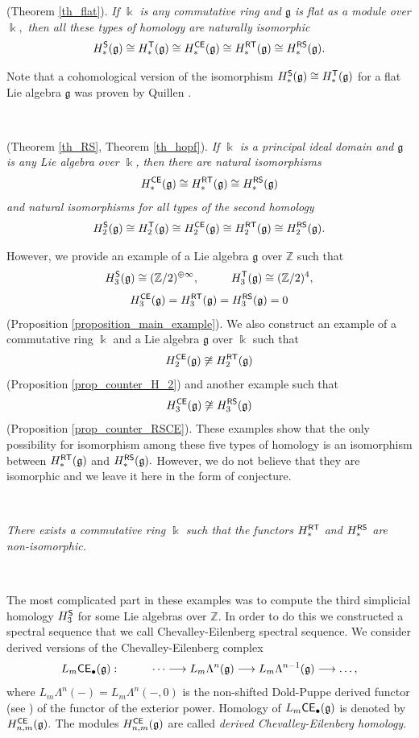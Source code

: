 \documentclass{amsart}
\numberwithin{equation}{section}
\theoremstyle{definition}
\def\gg{\mathfrak{g}}
\def\kk{\Bbbk}
\def\ZZ{\mathbb{Z}}
\begin{document}
 (Theorem \ref{th_flat}). {\it If $\kk$ is any commutative ring and $\gg$ is flat as a module over $\kk,$ then all these types of homology are naturally isomorphic
$$H^{\sf S}_*(\gg) \cong H^{\sf T}_*(\gg)\cong H^{\sf CE}_*(\gg)\cong  H^{\sf RT}_*(\gg)\cong H^{\sf RS}_*(\gg).$$}

Note that a cohomological version of the isomorphism $H^{\sf S}_*(\gg)\cong H^{\sf T}_*(\gg)$ for a flat Lie algebra $\gg$ was proven  by Quillen \cite[Prop. 3.7]{quillen1970co}. 

\ 
  
 (Theorem \ref{th_RS}, Theorem \ref{th_hopf}). {\it  If $\kk$ is a principal ideal domain and $\gg$ is any Lie algebra over $\kk$, then there are natural isomorphisms $$H^{\sf CE}_*(\gg)\cong H^{\sf RT}_*(\gg)\cong H^{\sf RS}_*(\gg)$$ 
and natural isomorphisms for all types of the second homology
$$H^{\sf S}_2(\gg) \cong H^{\sf T}_2(\gg)\cong H^{\sf CE}_2(\gg)\cong  H^{\sf RT}_2(\gg)\cong H^{\sf RS}_2(\gg).$$
}

\noindent However, we provide an example of a Lie algebra $\gg$ over $\ZZ$ such that 
$$H_3^{\sf S}(\gg)\cong (\ZZ/2)^{\oplus \infty} , \hspace{1cm}  H_3^{\sf T}(\gg) \cong (\ZZ/2)^4,$$
$$  H_3^{\sf CE}(\gg)=H_3^{\sf RT}(\gg)=H^{\sf RS}_3(\gg)=0$$
(Proposition \ref{proposition_main_example}). We also construct an example of a commutative ring $\kk$ and a Lie algebra $\gg$ over $\kk$ such that 
$$H_2^{\sf CE}(\gg)\not\cong H_2^{\sf RT}(\gg)$$
(Proposition  \ref{prop_counter_H_2}) and another example such that 
$$H_3^{\sf CE}(\gg)\not \cong H_3^{\sf RS}(\gg)$$
(Proposition \ref{prop_counter_RSCE}). These examples show that the only possibility for isomorphism among  these five types of homology is an isomorphism between $H_*^{\sf RT}(\gg)$ and $H_*^{\sf RS}(\gg).$ However, we do not believe that they are isomorphic and we leave it here in the form of conjecture.

\ 

 {\it There exists a commutative ring $\kk$ such that the functors   $H_*^{\sf RT}$ and $H_*^{\sf RS}$ are non-isomorphic.}

\ 

The most complicated part in these examples was to compute the third simplicial homology $H_3^{\sf S}$ for some Lie algebras over $\ZZ.$ In order to do this we constructed a spectral sequence that we call Chevalley-Eilenberg spectral sequence. We consider derived versions of the  Chevalley-Eilenberg complex 
$$L_m{\sf CE}_\bullet(\gg): \hspace{1cm}  \dots\longrightarrow  L_m \Lambda^n (\gg) \longrightarrow  L_m \Lambda^{n-1}(\gg) \longrightarrow \dots  ,$$
where $L_m\Lambda^n(-)=L_m\Lambda^n(-,0)$ is the non-shifted Dold-Puppe  derived functor (see \cite{dold1961homologie}) of the functor of the exterior power. Homology of $L_m{\sf CE}_\bullet(\gg)$ is denoted by $H_{n,m}^{\sf CE}(\gg).$ The modules $H_{n,m}^{\sf CE}(\gg)$ are called {\it derived  Chevalley-Eilenberg homology}. 
\end{document}

